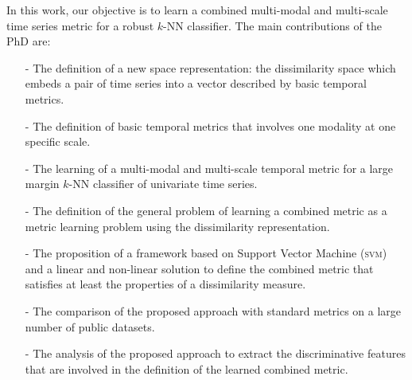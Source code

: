 In this work, our objective is to learn a combined multi-modal and multi-scale time series metric for a robust $k$-NN classifier. The main contributions of the PhD are:
\begin{itemize}
	\item[-] The definition of a new space representation: the dissimilarity space which embeds a pair of time series into a vector described by basic temporal metrics.
	\item[-] The definition of basic temporal metrics that involves one modality at one specific scale.
	\item[-] The learning of a multi-modal and multi-scale temporal metric for a large margin $k$-NN classifier of univariate time series. 
	\item[-] The definition of the general problem of learning a combined metric as a metric learning problem using the dissimilarity representation. 
	\item[-] The proposition of a framework based on Support Vector Machine (\textsc{svm}) and a linear and non-linear solution to define the combined metric that satisfies at least the properties of a dissimilarity measure.
	\item[-] The comparison of the proposed approach with standard metrics on a large number of public datasets.
	\item[-] The analysis of the proposed approach to extract the discriminative features that are involved in the definition of the learned combined metric. 
\end{itemize}


